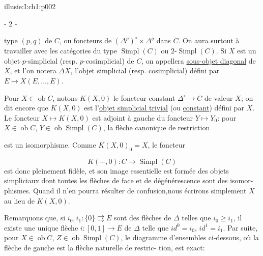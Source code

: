 \IllusieSetPhysicalPageSize{447bp}{698.6bp}
\begin{illusiebodypage}{illusie:I:ch1:p002}
\begin{center}- 2 -\end{center}
\vspace{8bp}\fontsize{9}{14}\selectfont

\hypertarget{illusie:I:ch1:s1:1:p2c1}{}%
\noindent type $(p,q)$ de $C$, ou foncteurs de
$(\Delta^p)^{\circ}\times\Delta^q$ dans $C$. On aura surtout à travailler avec
les catégories du type $\operatorname{Simpl}(C)$ ou
$2\text{-}\operatorname{Simpl}(C)$. Si $X$ est un objet $p$-simplicial (resp.
$p$-cosimplicial) de $C$, on appellera \underline{sous-objet diagonal} de $X$,
et l'on notera $\Delta X$, l'objet simplicial (resp. cosimplicial) défini par
$E\longmapsto X(E,\ldots,E)$.

\hypertarget{illusie:I:ch1:s1:1:p3}{}%
Pour $X\in\operatorname{ob}C$, notons $K(X,0)$ le foncteur constant
$\Delta^{\circ}\longrightarrow C$ de valeur $X$; on dit encore que $K(X,0)$
est l'\underline{objet simplicial trivial} (ou \underline{constant}) défini par
$X$. Le foncteur $X\longmapsto K(X,0)$ est adjoint à gauche du foncteur
$Y\longmapsto Y_0$: pour $X\in\operatorname{ob}C$,
$Y\in\operatorname{ob}\operatorname{Simpl}(C)$, la flèche canonique de
restriction

\hypertarget{illusie:I:ch1:s1:1:eq2}{}%
\noindent{}\par

est un isomorphisme. Comme $K(X,0)_0=X$, le foncteur

\hypertarget{illusie:I:ch1:s1:1:d3}{}%
\[
  K(-,0):C\longrightarrow\operatorname{Simpl}(C)
\]
est donc pleinement fidèle, et son image essentielle est formée des objets
simpliciaux dont toutes les flèches de face et de dégénérescence sont des
isomor- phismes. Quand il n'en pourra résulter de confusion,nous écrirons
simplement $X$ au lieu de $K(X,0)$.

\hypertarget{illusie:I:ch1:s1:1:p4}{}%
Remarquons que, si $i_0,i_1:\{0\}\rightrightarrows E$ sont des flèches de
$\Delta$ telles que $i_0\geq i_1$, il existe une unique flèche
$i:[0,1]\longrightarrow E$ de $\Delta$ telle que $i d^0=i_0$, $i d^1=i_1$.
Par suite, pour $X\in\operatorname{ob}C$,
$Z\in\operatorname{ob}\operatorname{Simpl}(C)$, le diagramme d'ensembles
ci-dessous, où la flèche de gauche est la flèche naturelle de restric- tion,
est exact:


\end{illusiebodypage}

